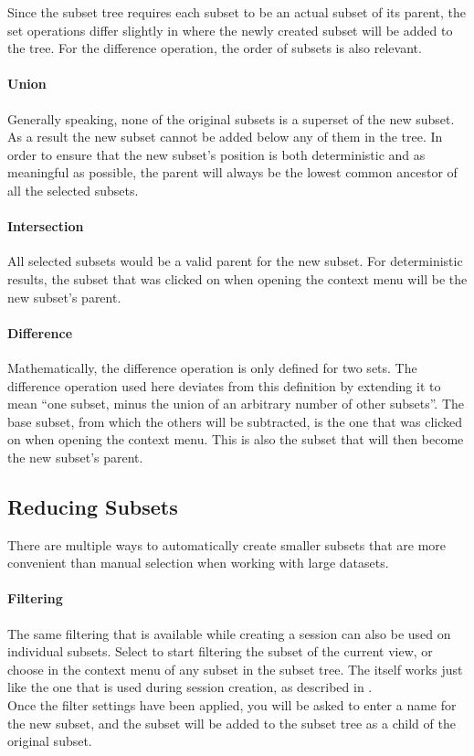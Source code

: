 Since the subset tree requires each subset to be an actual subset of its parent, the set operations differ slightly in where the newly created subset will be added to the tree.
For the difference operation, the order of subsets is also relevant.

\paragraph{Union}
Generally speaking, none of the original subsets is a superset of the new subset.
As a result the new subset cannot be added below any of them in the tree.
In order to ensure that the new subset's position is both deterministic and as meaningful as possible, the parent will always be the lowest common ancestor of all the selected subsets.

\paragraph{Intersection}
All selected subsets would be a valid parent for the new subset.
For deterministic results, the subset that was clicked on when opening the context menu will be the new subset's parent.

\paragraph{Difference}
Mathematically, the difference operation is only defined for two sets.
The difference operation used here deviates from this definition by extending it to mean ``one subset, minus the union of an arbitrary number of other subsets''.
The base subset, from which the others will be subtracted, is the one that was clicked on when opening the context menu.
This is also the subset that will then become the new subset's parent.


\subsection{Reducing Subsets}
There are multiple ways to automatically create smaller subsets that are more convenient than manual selection when working with large datasets.

\paragraph{Filtering}
The same filtering that is available while creating a session can also be used on individual subsets.
Select  to start filtering the subset of the current view, or choose  in the context menu of any subset in the subset tree.
The  itself works just like the one that is used during session creation, as described in .
\\
Once the filter settings have been applied, you will be asked to enter a name for the new subset, and the subset will be added to the subset tree as a child of the original subset.

